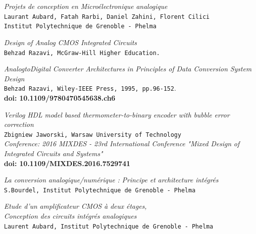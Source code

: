 \documentclass[11pt]{article}
\begin{document}
\begin{thebibliography}{9}
\textit{Projets de conception en Micro\'electronique analogique}\\
\texttt{Laurant Aubard, Fatah Rarbi, Daniel Zahini, Florent Cilici}\\
\texttt{Institut Polytechnique de Grenoble - Phelma}

\textit{Design of Analog CMOS Integrated Circuits}
\\\texttt{Behzad Razavi, McGraw-Hill Higher Education.}

  \textit{AnalogtoDigital Converter Architectures}
\textit{in Principles of Data Conversion System Design}\\
\texttt{Behzad Razavi, Wiley-IEEE Press, 1995, pp.96-152}.\\
\textbf{doi: 10.1109/9780470545638.ch6}

\textit{Verilog HDL model based thermometer-to-binary encoder with bubble error correction}\\
\texttt{Zbigniew Jaworski, Warsaw University of Technology}\\
\textit{Conference: 2016 MIXDES - 23rd International Conference "Mixed Design of Integrated Circuits and Systems"}\\
\textbf{doi: 10.1109/MIXDES.2016.7529741}

\textit{La conversion analogique/num\'erique : Principe et architecture int\'egr\'es}\\
\texttt{S.Bourdel, Institut Polytechnique de Grenoble - Phelma}

\textit{Etude d'un amplificateur CMOS \`a deux \'etages,}\\
\textit{Conception des circuits int\'egr\'es analogiques}\\
\texttt{Laurent Aubard, Institut Polytechnique de Grenoble - Phelma}

\end{thebibliography}
\end{document}

